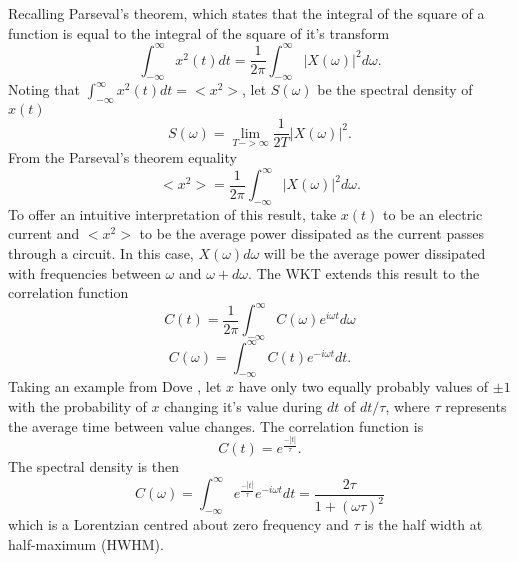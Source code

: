 Recalling Parseval's theorem, which states that the integral of the square of a function is equal to the integral of the square of it's transform
%
\begin{equation}
\int_{-\infty}^{\infty}x^2(t)dt=\frac{1}{2\pi}\int_{-\infty}^{\infty}|X(\omega)|^2d\omega.
\end{equation}
%
Noting that $\int_{-\infty}^{\infty}x^2(t)dt=<x^2>$, let $S(\omega)$ be the spectral density of $x(t)$
%
\begin{equation}
S(\omega)=\lim_{T->\infty}\frac{1}{2T}|X(\omega)|^2.
\end{equation}
%
From the Parseval's theorem equality
%
\begin{equation}
<x^2>=\frac{1}{2\pi}\int_{-\infty}^{\infty}|X(\omega)|^2d\omega.
\end{equation}
%
To offer an intuitive interpretation of this result, take $x(t)$ to be an electric current and $<x^2>$ to be the average power dissipated as the current passes through a circuit. In this case, $X(\omega)d\omega$ will be the average power dissipated with frequencies between $\omega$ and $\omega+d\omega$. The WKT extends this result to the correlation function
%
\begin{equation}
C(t)=\frac{1}{2\pi}\int_{-\infty}^{\infty}C(\omega)e^{i\omega t}d\omega
\end{equation}
%
\begin{equation}
C(\omega)=\int_{-\infty}^{\infty}C(t)e^{-i\omega t}dt.
\end{equation}
%
Taking an example from Dove \cite{dove_introduction_1993-3}, let $x$ have only two equally probably values of $\pm 1$ with the probability of $x$ changing it's value during $dt$ of $dt/\tau$, where $\tau$ represents the average time between value changes. The correlation function is
%
\begin{equation}
C(t)=e^{\frac{-|t|}{\tau}}.
\end{equation}
%
The spectral density is then
\begin{equation}\label{EQ:lorentzian_1}
C(\omega)=\int_{-\infty}^{\infty}e^{\frac{-|t|}{\tau}}e^{-i\omega t}dt=\frac{2\tau}{1+(\omega \tau )^2}
\end{equation}
which is a Lorentzian centred about zero frequency and $\tau$ is the half width at half-maximum (HWHM).

